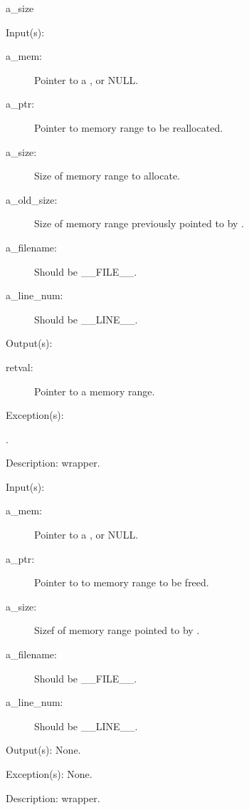 \begin{capi}
{{a\_size}}
\label{cw_realloc}
	\begin{capilist}
	\item[Input(s): ]
		\begin{description}\item[]
		\item[a\_mem: ]
			Pointer to a , or NULL.
		\item[a\_ptr: ]
			Pointer to memory range to be reallocated.
		\item[a\_size: ]
			Size of memory range to allocate.
		\item[a\_old\_size: ]
			Size of memory range previously pointed to by
			.
		\item[a\_filename: ]
			Should be \_\_FILE\_\_.
		\item[a\_line\_num: ]
			Should be \_\_LINE\_\_.
		\end{description}
	\item[Output(s): ]
		\begin{description}\item[]
		\item[retval: ]
			Pointer to a memory range.
		\end{description}
	\item[Exception(s): ]
		\begin{description}\item[]
		\item[.]
		\end{description}
	\item[Description: ]
		 wrapper.
	\end{capilist}
\label{mem_free_e}
\label{mem_free}
\label{cw_free}
	\begin{capilist}
	\item[Input(s): ]
		\begin{description}\item[]
		\item[a\_mem: ]
			Pointer to a , or NULL.
		\item[a\_ptr: ]
			Pointer to to memory range to be freed.
		\item[a\_size: ]
			Sizef of memory range pointed to by \cvar{a\_ptr}.
		\item[a\_filename: ]
			Should be \_\_FILE\_\_.
		\item[a\_line\_num: ]
			Should be \_\_LINE\_\_.
		\end{description}
	\item[Output(s): ] None.
	\item[Exception(s): ] None.
	\item[Description: ]
		 wrapper.
	\end{capilist}
\end{capi}

